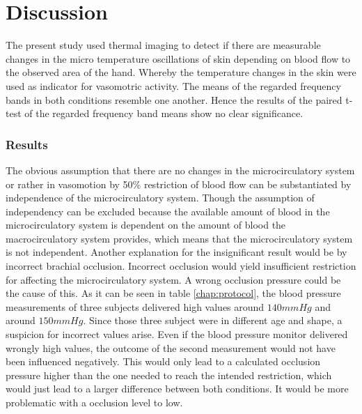 \chapter{Discussion}

The present study used thermal imaging to detect if there are measurable changes in the micro temperature oscillations of skin depending on blood flow to the observed area of the hand. Whereby the temperature changes in the skin were used as indicator for vasomotric activity. %
The means of the regarded frequency bands in both conditions resemble one another. Hence the results of the paired t-test of the regarded frequency band means show no clear significance.  %

\subsection{Results}
The obvious assumption that there are no changes in the microcirculatory system or rather in vasomotion by 50\% restriction of blood flow can be substantiated by independence of the microcirculatory system. Though the assumption of independency can be excluded because the available amount of blood in the microcirculatory system is dependent on the amount of blood the macrocirculatory system provides, which means that the microcirculatory system is not independent. 
Another explanation for the insignificant result would be by incorrect brachial occlusion. Incorrect occlusion would yield insufficient restriction for affecting the microcirculatory system. %
A wrong occlusion pressure could be the cause of this. As it can be seen in table \ref{chap:protocol}, the blood pressure measurements of three subjects delivered high values around $140 mmHg$ and around $150 mmHg$. Since those three subject were in different age and shape, a suspicion for incorrect values arise. %
Even if the blood pressure monitor delivered wrongly high values, the outcome of the second measurement would not have been influenced negatively. This would only lead to a calculated occlusion pressure higher than the one needed to reach the intended restriction, which would just lead to a larger difference between both conditions. It would be more problematic with a occlusion level to low.  %

